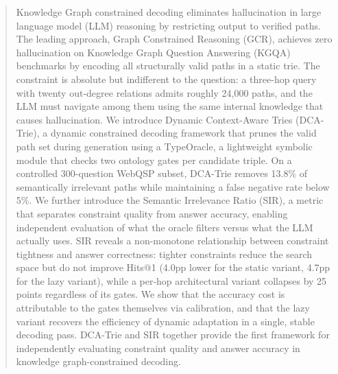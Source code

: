 \documentclass[12pt, onehalfspacing, liststotoc, oneside, parskip, headsepline,UKenglish]{UMaT_Undergrauate_Report_Template_Configurations}
\begin{document}

\begin{abstract}
  \vspace{10pt}
  \addchaptertocentry{\abstractname}
  Knowledge Graph constrained decoding eliminates hallucination in large language model (LLM) reasoning by restricting output to verified paths. The leading approach, Graph Constrained Reasoning (GCR), achieves zero hallucination on Knowledge Graph Question Answering (KGQA) benchmarks by encoding all structurally valid paths in a static trie. The constraint is absolute but indifferent to the question: a three-hop query with twenty out-degree relations admits roughly 24{,}000 paths, and the LLM must navigate among them using the same internal knowledge that causes hallucination. We introduce Dynamic Context-Aware Tries (DCA-Trie), a dynamic constrained decoding framework that prunes the valid path set during generation using a TypeOracle, a lightweight symbolic module that checks two ontology gates per candidate triple. On a controlled 300-question WebQSP subset, DCA-Trie removes 13.8\% of semantically irrelevant paths while maintaining a false negative rate below 5\%. We further introduce the Semantic Irrelevance Ratio (SIR), a metric that separates constraint quality from answer accuracy, enabling independent evaluation of what the oracle filters versus what the LLM actually uses. SIR reveals a non-monotone relationship between constraint tightness and answer correctness: tighter constraints reduce the search space but do not improve Hits@1 (4.0pp lower for the static variant, 4.7pp for the lazy variant), while a per-hop architectural variant collapses by 25 points regardless of its gates. We show that the accuracy cost is attributable to the gates themselves via calibration, and that the lazy variant recovers the efficiency of dynamic adaptation in a single, stable decoding pass. DCA-Trie and SIR together provide the first framework for independently evaluating constraint quality and answer accuracy in knowledge graph-constrained decoding.

\end{abstract}

\end{document}
